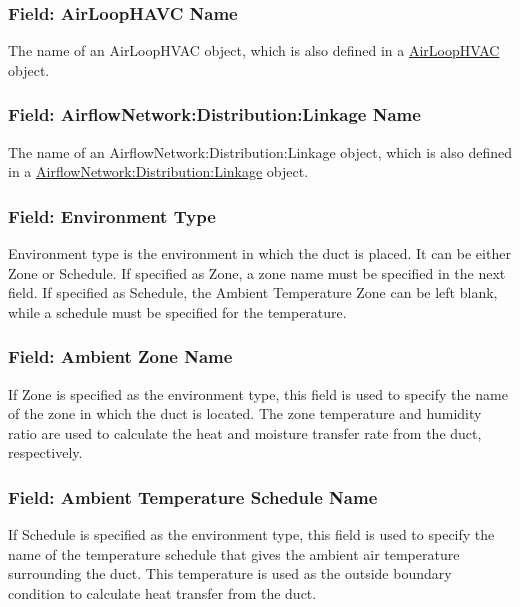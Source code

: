 \subsubsection{Field: AirLoopHAVC Name}\label{duct-conduction-airloophavcname}

The name of an AirLoopHVAC object, which is also defined in a \hyperref[airloophvac]{AirLoopHVAC} object.

\subsubsection{Field: AirflowNetwork:Distribution:Linkage Name}\label{duct-conduction-airflownetworkdistributionlinkagename}

The name of an AirflowNetwork:Distribution:Linkage object, which is also defined in a \hyperref[airflownetworkdistributionlinkage]{AirflowNetwork:Distribution:Linkage} object.

\subsubsection{Field: Environment Type}\label{environmenttype}

Environment type is the environment in which the duct is placed. It can be either Zone or Schedule. If specified as Zone, a zone name must be specified in the next field. If specified as Schedule, the Ambient Temperature Zone can be left blank, while a schedule must be specified for the temperature.

\subsubsection{Field: Ambient Zone Name}\label{ambienttemperaturezonename}

If Zone is specified as the environment type, this field is used to specify the name of the zone in which the duct is located. The zone temperature and humidity ratio are used to calculate the heat and moisture transfer rate from the duct, respectively.

\subsubsection{Field: Ambient Temperature Schedule Name}\label{ductloss-ambienttemperatureschedulename}

If Schedule is specified as the environment type, this field is used to specify the name of the temperature schedule that gives the ambient air temperature surrounding the duct. This temperature is used as the outside boundary condition to calculate heat transfer from the duct.

